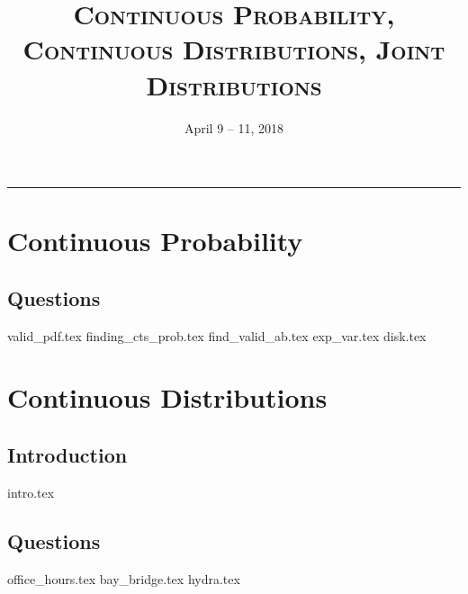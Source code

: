 \documentclass{exam}
\title{\textsc{Continuous Probability, Continuous Distributions, Joint Distributions}}
\date{April 9 -- 11, 2018}
\begin{document}
\maketitle
\rule{\textwidth}{0.15em}
\fontsize{12}{15}\selectfont
\thispagestyle{empty}

\section{Continuous Probability}

\subsection{Questions}
\begin{questions}
    {valid_pdf.tex}
    {finding_cts_prob.tex} 
    {find_valid_ab.tex}
    {exp_var.tex}
    {disk.tex}
\end{questions}

\section{Continuous Distributions}
\subsection{Introduction}
{intro.tex}
\subsection{Questions}
\begin{questions}
    {office_hours.tex}
    {bay_bridge.tex}
    {hydra.tex}
\end{questions} 
\end{document}
